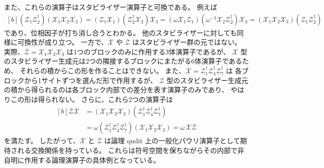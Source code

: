 \documentclass[../master.tex]{subfiles}
\begin{document}
また、これらの演算子はスタビライザー演算子と可換である。
例えば
\begin{equation}\begin{aligned}[b]
    (\mathcal{Z}_1\mathcal{Z}_2^\dagger)(\mathcal{X}_1\mathcal{X}_2\mathcal{X}_3)
    = (\mathcal{Z}_1\mathcal{X}_1)(\mathcal{Z}_2^\dagger\mathcal{X}_2)\mathcal{X}_3
    = (\omega\mathcal{X}_1\mathcal{Z}_1)(\omega^{-1}\mathcal{X}_2\mathcal{Z}_2^\dagger)\mathcal{X}_3
    = (\mathcal{X}_1\mathcal{X}_2\mathcal{X}_3)(\mathcal{Z}_1\mathcal{Z}_2^\dagger)
\end{aligned}\end{equation}
であり、位相因子が打ち消し合うとわかる。
他のスタビライザーに対しても同様に可換性が成り立つ。
一方で、$\overline{\mathcal{X}}$ や $\overline{\mathcal{Z}}$ はスタビライザー群の元ではない。
実際、$\overline{\mathcal{Z}}=\mathcal{X}_1\mathcal{X}_2\mathcal{X}_3$ は1つのブロックのみに作用する3体演算子であるが、
$\mathcal{X}$ 型のスタビライザー生成元は2つの隣接するブロックにまたがる6体演算子であるため、
それらの積からこの形を作ることはできない。
また、$\overline{\mathcal{X}}=\mathcal{Z}_1^\dagger \mathcal{Z}_4^\dagger \mathcal{Z}_7^\dagger$ は
各ブロックから1サイトずつを選んだ形で作用するが、
$\mathcal{Z}$ 型のスタビライザー生成元の積から得られるのは各ブロック内部での差分を表す演算子のみであり、
やはりこの形は得られない。
さらに、これら2つの演算子は
\begin{equation}\begin{aligned}[b]
    \overline{\mathcal{Z}}\overline{\mathcal{X}}
    &= (\mathcal{X}_1\mathcal{X}_2\mathcal{X}_3)
    (\mathcal{Z}_1^\dagger \mathcal{Z}_4^\dagger \mathcal{Z}_7^\dagger)\\
    &= \omega
    (\mathcal{Z}_1^\dagger \mathcal{Z}_4^\dagger \mathcal{Z}_7^\dagger)
    (\mathcal{X}_1\mathcal{X}_2\mathcal{X}_3)
    = \omega\,\overline{\mathcal{X}}\overline{\mathcal{Z}}
\end{aligned}\end{equation}
を満たす。
したがって、$\overline{\mathcal{X}}$ と $\overline{\mathcal{Z}}$ は論理 qudit 上の一般化パウリ演算子として期待される交換関係を持っている。
これらは符号空間を保ちながらその内部で非自明に作用する論理演算子の具体例となっている。
\end{document}
